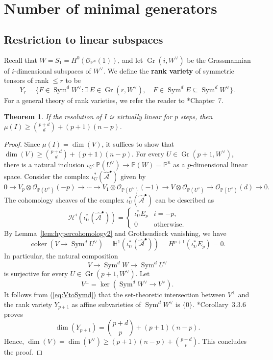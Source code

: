 \documentclass[11pt,letterpaper,reqno]{amsart}
\newcommand{\Gr}{\operatorname{Gr}}
\newcommand{\Sym}{\operatorname{Sym}}
\newcommand{\coker}{\operatorname{coker}}
\renewcommand{\ker}{\operatorname{ker}}
\newcommand{\mc}[1]{\mathcal{#1}}
\def\PP{{\mathbb P}}
\def\lra{\longrightarrow}
\newtheorem{theorem}{Theorem}[section]
\theoremstyle{definition}
\numberwithin{equation}{section}
\begin{document}
\section{Number of minimal generators}
\subsection{Restriction to linear subspaces}
Recall that $W = S_1 = H^0(\mc{O}_{\PP^n}(1))$, and let $\Gr(i,W^\vee)$ be the Grassmannian of $i$-dimensional subspaces of $W^\vee$. We define the \textbf{rank variety} of symmetric tensors of rank $\le r$ to be
\[Y_r = \{F \in \Sym^dW^\vee \colon \exists\, E \in \Gr(r,W^\vee), \quad F \in \Sym^dE \subseteq \Sym^d W^\vee\}.\]
For a general theory of rank varieties, we refer the reader to \cite{weyman}*{Chapter~7}.
\begin{theorem}\label{thm:geometricBound}
    If the resolution of $I$ is virtually linear for $p$ steps, then $\mu(I) \ge \binom{p+d}{d} + (p+1)(n-p)$.
\end{theorem}
\begin{proof}
    Since $\mu(I) = \dim(V)$, it suffices to show that $\dim(V) \ge \binom{p+d}{d} + (p+1)(n-p)$.
    For every $U \in \Gr(p+1,W^\vee)$, there is a natural inclusion $\iota_U \colon \PP(U^\vee) \lra \PP(W) = \PP^n$ as a $p$-dimensional linear space. Consider the complex $\iota_U^\ast\left( \widehat{\mc{A}}^\bullet\right)$ given by
    \[0 \lra V_p \otimes \mc{O}_{\PP(U^\vee)}(-p) \lra \cdots \lra V_1 \otimes \mc{O}_{\PP(U^\vee)}(-1) \lra V \otimes \mc{O}_{\PP(U^\vee)} \lra \mc{O}_{\PP(U^\vee)}(d) \lra 0.\]
    The cohomology sheaves of the complex $\iota_U^\ast\left( \widehat{\mc{A}}^\bullet\right)$ can be described as
    \[\mc{H}^i\left( \iota_U^\ast\left( \widehat{\mc{A}}^\bullet\right)\right)=
    \begin{cases}
        \iota_U^\ast E_p & i = -p,\\
        0 &\text{otherwise}.
    \end{cases}\]
    By Lemma~\ref{lem:hypercohomology2} and Grothendieck vanishing, we have
    \[\coker\left(V \lra \Sym^d U^\vee \right) = \mathbb{H}^1\left( \iota_{U}^\ast\left( \widehat{\mc{A}}^\bullet\right)\right) = H^{p+1}(\iota_U^\ast E_p) = 0.\]
    In particular, the natural composition
    \begin{equation}\label{eq:VtoSymd}
        V \lra \Sym^d W \lra \Sym^d U^\vee
    \end{equation}
    is surjective for every $U \in \Gr(p+1,W^\vee)$. Let 
    \[V^\perp = \ker(\Sym^d W^\vee \lra V^\vee).\]
    It follows from (\ref{eq:VtoSymd}) that the set-theoretic intersection between $V^\perp$ and the rank variety $Y_{p+1}$ as affine subvarieties of $\Sym^d W^\vee$ is $\{0\}$. \cite{P}*{Corollary~3.3.6} proves 
    \[\dim(Y_{p+1}) = \binom{p+d}{p} + (p+1)(n-p).\]
    Hence, $\dim(V) = \dim(V^\vee) \ge (p+1)(n-p) + \binom{p+d}{p}$. This concludes the proof.
\end{proof}
\end{document}
